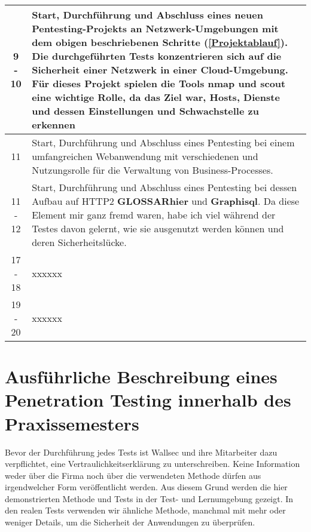 \begin{table}[H]
\begin{tabularx}{\textwidth}{|c|X|}
    9 - 10      &  Start, Durchführung und Abschluss eines neuen Pentesting-Projekts an Netzwerk-Umgebungen mit dem obigen beschriebenen Schritte (\ref{Projektablauf}). Die durchgeführten Tests konzentrieren sich auf die Sicherheit einer Netzwerk in einer Cloud-Umgebung. Für dieses Projekt spielen die Tools \gls{nmap} und \gls{scout} eine wichtige Rolle, da das Ziel war, Hosts, Dienste und dessen Einstellungen und \gls{Schwachstelle} zu erkennen \\

    \hline

    11  	    &  Start, Durchführung und Abschluss eines Pentesting bei einem umfangreichen Webanwendung mit verschiedenen \glsplural{Tennant} und Nutzungsrolle für die Verwaltung von Business-Processes. \\

    \hline

    11 - 12      &  Start, Durchführung und Abschluss eines Pentesting bei dessen Aufbau auf HTTP2 \textbf{GLOSSARhier} und \textbf{Graphisql}. Da diese Element mir ganz fremd waren, habe ich viel während der Testes davon gelernt, wie sie ausgenutzt werden können und deren Sicherheitslücke. \\


    \hline

    17 - 18      &  xxxxxx \\

    \hline

    19 - 20      &  xxxxxx \\


       \bottomrule
    \end{tabularx}
\end{table}

\section{Ausführliche Beschreibung eines Penetration Testing innerhalb des Praxissemesters}

Bevor der Durchführung jedes Tests ist Wallsec und ihre Mitarbeiter dazu verpflichtet, eine Vertraulichkeitserklärung zu unterschreiben. Keine Information weder über die Firma noch über die verwendeten Methode dürfen aus irgendwelcher Form veröffentlicht werden. Aus diesem Grund werden die hier demonstrierten Methode und Tests in der Test- und Lernumgebung  gezeigt. In den realen Tests verwenden wir ähnliche Methode, manchmal mit mehr oder weniger Details, um die Sicherheit der Anwendungen zu überprüfen. 


